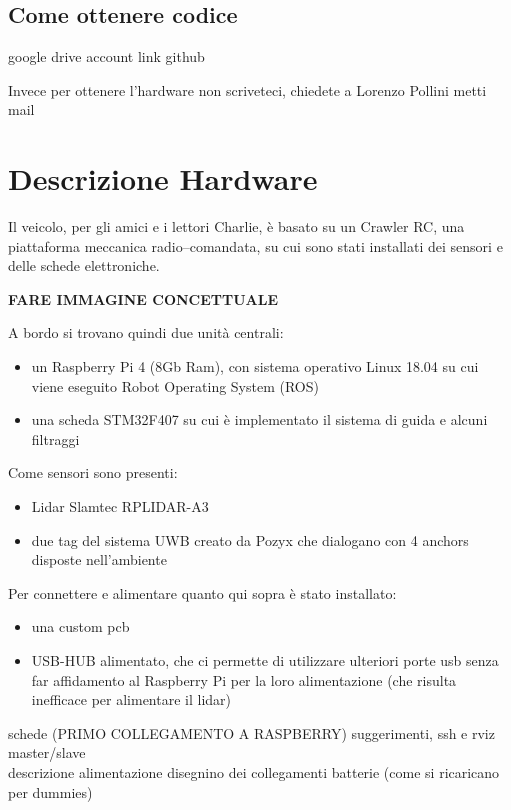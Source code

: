 \subsection*{Come ottenere codice}
google drive account
link github

Invece per ottenere l'hardware non scriveteci, chiedete a Lorenzo Pollini metti mail

\section{Descrizione Hardware}

Il veicolo, per gli amici e i lettori Charlie, \`e basato su un Crawler RC, una piattaforma meccanica radio--comandata, su cui sono stati installati dei sensori e delle schede elettroniche. 

\textbf{FARE IMMAGINE CONCETTUALE}

A bordo si trovano quindi due unit\`a centrali:
\begin{itemize}
	\item un Raspberry Pi 4 (8Gb Ram), con sistema operativo Linux 18.04 su cui viene eseguito Robot Operating System (ROS)
	\item una scheda STM32F407 su cui è implementato il sistema di guida e alcuni filtraggi
\end{itemize}

Come sensori sono presenti:
\begin{itemize}
	\item Lidar Slamtec RPLIDAR-A3
	
	\item due tag del sistema UWB creato da Pozyx che dialogano con 4 anchors disposte nell'ambiente
\end{itemize}

Per connettere e alimentare quanto qui sopra \`e stato installato:
\begin{itemize}
	\item una custom pcb 
	
	\item USB-HUB alimentato, che ci permette di utilizzare ulteriori porte usb senza far affidamento al Raspberry Pi per la loro alimentazione (che risulta inefficace per alimentare il lidar)
\end{itemize}



schede (PRIMO COLLEGAMENTO A RASPBERRY)
suggerimenti, ssh e rviz master/slave \\
descrizione alimentazione
disegnino dei collegamenti
batterie (come si ricaricano per dummies)

